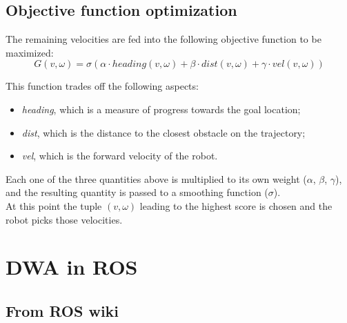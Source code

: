 \documentclass[11pt,a4paper]{article}
\begin{document}

\subsection{Objective function optimization}

The remaining velocities are fed into the following objective function to be maximized:
$$
G(v, \omega) = \sigma(\alpha \cdot heading(v, \omega)
+ \beta \cdot dist(v, \omega) + \gamma \cdot vel(v, \omega))
$$

This function trades off the following aspects:
\begin{itemize}
    \item \textit{heading}, which is a measure of progress towards the goal location;
    \item \textit{dist}, which is the distance to the closest obstacle on the trajectory;
    \item \textit{vel}, which is the forward velocity of the robot.\\
\end{itemize}

Each one of the three quantities above is multiplied to its own weight ($\alpha$, $\beta$, $\gamma$),
and the resulting quantity is passed to a smoothing function ($\sigma$).\\

At this point the tuple $(v, \omega)$ leading to the highest score is chosen and the robot picks those velocities.





\section{DWA in ROS}



\subsection{From ROS wiki}
\end{document}
